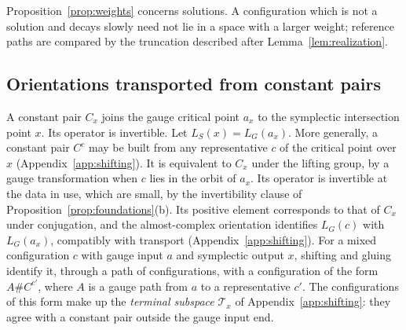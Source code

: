 \documentclass[11pt]{amsart}
\theoremstyle{definition}
\theoremstyle{remark}
\theoremstyle{plain}
\numberwithin{equation}{section}
\begin{document}
Proposition~\ref{prop:weights} concerns solutions. A configuration
which is not a solution and decays slowly need not lie in a space with
a larger weight; reference paths are compared by the truncation
described after Lemma~\ref{lem:realization}.

\subsection{Orientations transported from constant pairs}
A constant pair $C_x$ joins the gauge critical point $a_x$
to the symplectic intersection point $x$. Its operator is
invertible. Let $L_S(x)=L_G(a_x)$. More generally, a constant pair
$C^{c}$ may be built from any representative $c$ of the critical
point over $x$ (Appendix~\ref{app:shifting}). It is equivalent to
$C_x$ under the lifting group, by a gauge transformation when $c$
lies in the orbit of $a_x$. Its operator is invertible at the data in
use, which are small, by the invertibility clause of
Proposition~\ref{prop:foundations}(b). Its positive element corresponds
to that of $C_x$ under conjugation, and the almost-complex orientation
identifies $L_G(c)$ with $L_G(a_x)$, compatibly with transport
(Appendix~\ref{app:shifting}). For a mixed configuration
$c$ with gauge input $a$ and symplectic output $x$, shifting
and gluing identify it, through a path of configurations,
with a configuration of the form $A\# C^{c'}$, where $A$ is a
gauge path from $a$ to a representative $c'$. The configurations of
this form make up the \emph{terminal subspace} $\mathcal T_x$ of
Appendix~\ref{app:shifting}: they agree with a constant pair outside
the gauge input end.
\end{document}
